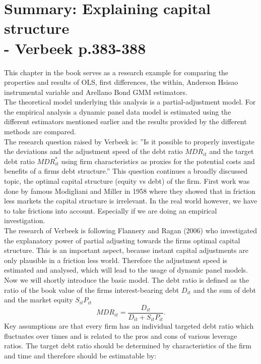 \documentclass[document.tex]{subfiles}
\begin{document}
\section*{Summary: Explaining capital structure \protect\\ - Verbeek p.383-388}
This chapter in the book serves as a research example for comparing the properties and results of OLS, first differences, the within, Anderson Hsisao
instrumental variable and Arellano Bond GMM estimators. \\
The theoretical model underlying this analysis is a partial-adjustment model. For the empirical analysis a dynamic panel data model is estimated using the different estimators mentioned earlier and the results provided by the different methods are compared.\\
The research question raised by Verbeek is: ''Is it possible to properly investigate the 
deviations and the adjustment speed of the debt ratio $MDR_{it}$ and the target debt ratio $MDR^*_{it}$ using firm characteristics as proxies for the potential costs and benefits of a firms debt structure.'' This question continues a broadly discussed topic, the optimal capital structure (equity vs debt) of the firm. First work was done by famous Modigliani and Miller in 1958 where they showed that in friction less markets the capital structure is irrelevant. In the real world however, we have to take frictions into account. Especially if we are doing an empirical investigation.
\\
The research of Verbeek is following Flannery and Ragan (2006) who investigated the explanatory power of partial adjusting towards the firms optimal capital structure. This is an important aspect, because instant capital adjustments are only plausible in a friction less world. Therefore the adjustment speed is estimated and analysed, which will lead to the usage of dynamic panel models.\\
Now we will shortly introduce the basic model. The debt ratio is defined as the ratio of the book value of the firms interest-bearing debt $D_{it}$
and the sum of debt and the market equity $S_{it}P_{it}$
\begin{equation}
MDR_{it}=\frac{D_{it}}{D_{it}+ S_{it}P_{it}}. 
\end{equation}
Key assumptions are that every firm has an individual targeted debt ratio which fluctuates over times and is related to the pros and cons of various leverage ratios. The target debt ratio should be determined by characteristics of the firm and time and therefore should be estimatable by:
\end{document}
